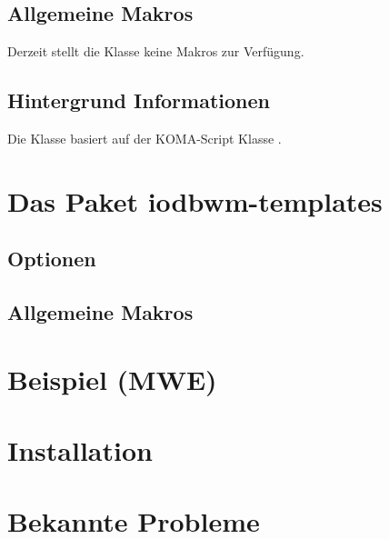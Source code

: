 \documentclass[babel=ngerman,highlight=false]{skdoc}
\begin{document}
        \subsection{Allgemeine Makros}
            Derzeit stellt die Klasse keine Makros zur Verfügung.
            
        \subsection{Hintergrund Informationen}
            Die Klasse basiert auf der KOMA-Script Klasse .

    \section{Das Paket iodbwm-templates}\label{pkg:iodhbwm-templates}
        \subsection{Optionen}
            \blindtext
        \subsection{Allgemeine Makros}
            \DescribeMacro{}
            
            \DescribeMacro{}
            
            \DescribeMacro\dhbwdeclaration
            
    \section{Beispiel (MWE)}
        \blindtext
            
    \section{Installation}
        \blindtext

    \section{Bekannte Probleme}
        \blindtext

    \PrintChanges
    \PrintIndex
\end{document}
